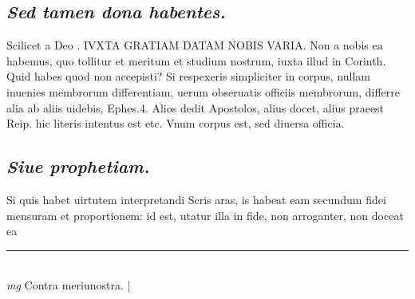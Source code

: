 \documentclass{article}
\begin{document}
\begin{pages}
\subsection*{\textit{Sed tamen dona habentes. }}\pstart Scilicet a Deo . IVXTA GRATIAM DATAM NOBIS VARIA. Non a nobis ea habemus, quo tollitur et meritum et studium nostrum, iuxta illud in Corinth. Quid habes quod non accepisti? Si respexeris simpliciter in corpus, nullam inuenies membrorum differentiam, uerum obseruatis officiis membrorum, differre alia ab aliis uidebis, Ephes.4. Alios dedit Apostolos, alius docet, alius praeest Reip. hic literis intentus est etc. Vnum corpus est, sed diuersa officia.  \pend
{}
{}
\subsection*{\textit{Siue prophetiam. }}\pstart Si quis habet uirtutem interpretandi Scris aras, is habeat eam secundum fidei mensuram et proportionem: id est, utatur illa in fide, non arroganter, non doceat ea  \pend
\vspace{0.5cm}\noindent
\vspace{0.2cm}\rule{1cm}{0.2pt}\\ 
\hspace{0.2cm}\textit{mg}
\footnotesize Contra meriunostra.  
\normalsize| 

\end{pages}
\end{document}

